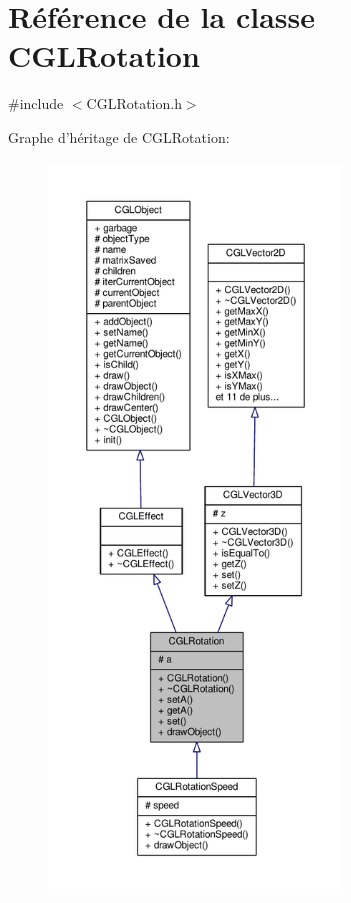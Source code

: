 \hypertarget{class_c_g_l_rotation}{\section{Référence de la classe C\-G\-L\-Rotation}
\label{class_c_g_l_rotation}
}


{\ttfamily \#include $<$C\-G\-L\-Rotation.\-h$>$}



Graphe d'héritage de C\-G\-L\-Rotation\-:
\nopagebreak
\begin{figure}[H]
\begin{center}
\leavevmode
\includegraphics[height=550pt]{d4/d97/class_c_g_l_rotation__inherit__graph}
\end{center}
\end{figure}


